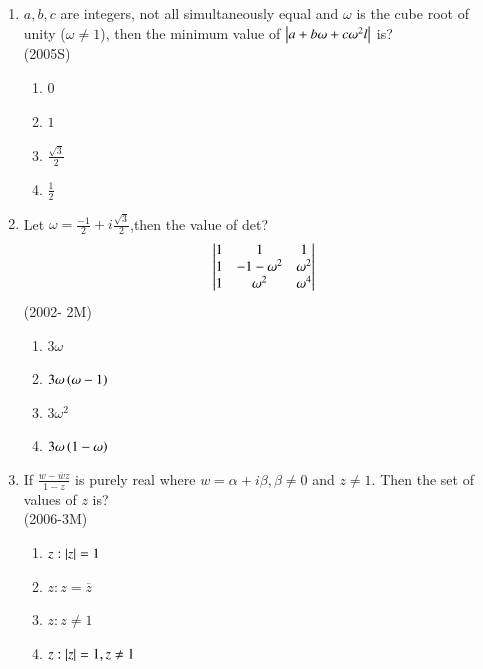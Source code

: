\documentclass[journal,12pt,twocolumn]{IEEEtran}
\theoremstyle{remark}
\begin{document}
\begin{enumerate}
\item $a,b,c$ are integers, not all simultaneously equal and $\omega$ is the cube root of unity ($\omega \neq 1$), then the minimum value of $\left\vert a+b\omega+c\omega^{2}l\right\vert$ is?         \\

        \hfill{(2005S)}
		\begin{multicols}{4}
\begin{enumerate}
	\item $0$
	\item $1$
	\item $\frac{\sqrt{3}}{2}$
	\item $\frac{1}{2}$
\end{enumerate}
                 \end{multicols}

\item Let $\omega=\frac{-1}{2}+i\frac{\sqrt{3}}{2}$,then the value of det?\\
	\begin{align}
		\begin{vmatrix}
	1     &1               &1            \\
	1     &-1-\omega^{2}   &\omega^{2}   \\
	1     &\omega^{2}      &\omega^{4}
                      \end{vmatrix}
	\end{align}
	\hfill{(2002- 2M)}
		\begin{multicols}{2}
\begin{enumerate}
	\item $3\omega$
	\item $3\omega\left(\omega-1\right)$
	\item $3\omega^{2}$
	\item $3\omega\left(1-\omega\right)$
\end{enumerate}
		\end{multicols}

\item If $\frac{w-\overline{w}z}{1-z}$ is purely real where $w=\alpha+i\beta, \beta \neq 0$ and $z \neq 1$. Then the set of values of $z$ is?                     \\

	\hfill{(2006-3M)}
		\begin{multicols}{2}
\begin{enumerate}
	\item {$z:\left\vert z\right\vert=1$}
	\item {$z:z= \overline{z}$}
	\item {$z:z \neq 1 $}
	\item {$z:\left\vert z\right\vert=1, z\neq1$}
\end{enumerate}
		\end{multicols}


\end{enumerate}
\end{document}
